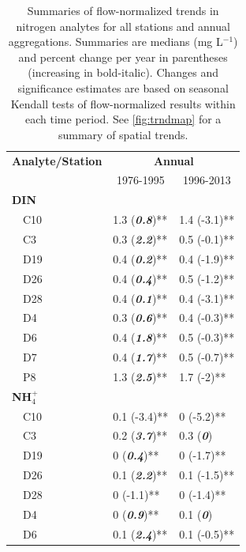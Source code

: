 \documentclass[journal = esthag, manuscript = article]{achemso}\usepackage[]{graphicx}\usepackage[]{color}
\begin{document}
\begin{table}[!tbp]
\caption{Summaries of flow-normalized trends in nitrogen analytes for all stations and annual aggregations.  Summaries are  medians (mg L$^{-1}$) and percent change per year in parentheses (increasing in bold-italic). Changes and significance estimates are based on seasonal Kendall tests of flow-normalized results within each time period. See \cref{fig:trndmap} for a summary of spatial trends.\label{tab:trndsann}} 
\begin{center}
\begin{tabular}{lll}
\hline\hline
\multicolumn{1}{l}{\bfseries Analyte/Station}&\multicolumn{2}{c}{\bfseries Annual}\tabularnewline
\cline{2-3}
\multicolumn{1}{l}{}&\multicolumn{1}{c}{1976-1995}&\multicolumn{1}{c}{1996-2013}\tabularnewline
\hline
{\bfseries DIN}&&\tabularnewline
~~C10&1.3 \footnotesize{(\textit{\textbf{0.8}})**}&1.4 \footnotesize{(-3.1)**}\tabularnewline
~~C3&0.3 \footnotesize{(\textit{\textbf{2.2}})**}&0.5 \footnotesize{(-0.1)**}\tabularnewline
~~D19&0.4 \footnotesize{(\textit{\textbf{0.2}})**}&0.4 \footnotesize{(-1.9)**}\tabularnewline
~~D26&0.4 \footnotesize{(\textit{\textbf{0.4}})**}&0.5 \footnotesize{(-1.2)**}\tabularnewline
~~D28&0.4 \footnotesize{(\textit{\textbf{0.1}})**}&0.4 \footnotesize{(-3.1)**}\tabularnewline
~~D4&0.3 \footnotesize{(\textit{\textbf{0.6}})**}&0.4 \footnotesize{(-0.3)**}\tabularnewline
~~D6&0.4 \footnotesize{(\textit{\textbf{1.8}})**}&0.5 \footnotesize{(-0.3)**}\tabularnewline
~~D7&0.4 \footnotesize{(\textit{\textbf{1.7}})**}&0.5 \footnotesize{(-0.7)**}\tabularnewline
~~P8&1.3 \footnotesize{(\textit{\textbf{2.5}})**}&1.7 \footnotesize{(-2)**}\tabularnewline
\hline
{\bfseries NH$_{4}^{+}$}&&\tabularnewline
~~C10&0.1 \footnotesize{(-3.4)**}&0 \footnotesize{(-5.2)**}\tabularnewline
~~C3&0.2 \footnotesize{(\textit{\textbf{3.7}})**}&0.3 \footnotesize{(\textit{\textbf{0}})}\tabularnewline
~~D19&0 \footnotesize{(\textit{\textbf{0.4}})**}&0 \footnotesize{(-1.7)**}\tabularnewline
~~D26&0.1 \footnotesize{(\textit{\textbf{2.2}})**}&0.1 \footnotesize{(-1.5)**}\tabularnewline
~~D28&0 \footnotesize{(-1.1)**}&0 \footnotesize{(-1.4)**}\tabularnewline
~~D4&0 \footnotesize{(\textit{\textbf{0.9}})**}&0.1 \footnotesize{(\textit{\textbf{0}})}\tabularnewline
~~D6&0.1 \footnotesize{(\textit{\textbf{2.4}})**}&0.1 \footnotesize{(-0.5)**}\tabularnewline

\end{tabular}
\end{center}
\end{table}
\end{document}
